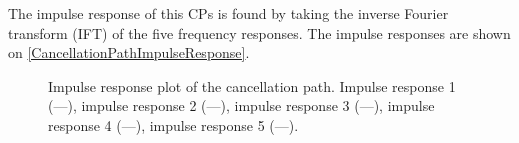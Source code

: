 
The impulse response of this CPs is found by taking the inverse Fourier transform (IFT) of the five frequency responses. 
The impulse responses are shown on \autoref{CancellationPathImpulseResponse}.

\begin{figure}[H]
	\centering
	
	\caption{Impulse response plot of the cancellation path. Impulse response 1 (\textcolor{MATLABblue}{---}), 
	impulse response 2 (\textcolor{MATLABorange}{---}), 	
	impulse response 3 (\textcolor{MATLAByellow}{---}), 	
	impulse response 4 (\textcolor{MATLABpurple}{---}), 	
	impulse response 5 (\textcolor{MATLABgreen}{---}). }
	\label{CancellationPathImpulseResponse}
\end{figure}






% 	


